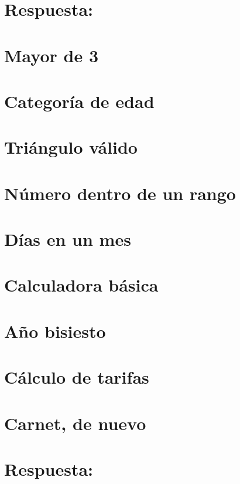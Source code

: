 \section*{Respuesta:}

\fi

\section{Mayor de 3}


\section{Categoría de edad}


\section{Triángulo válido}


\section{Número dentro de un rango}


\section{Días en un mes}


\section{Calculadora básica}


\section{Año bisiesto}


\section{Cálculo de tarifas}


\section{Carnet, de nuevo}

\ifshowanswers
\section*{Respuesta:}

\fi
